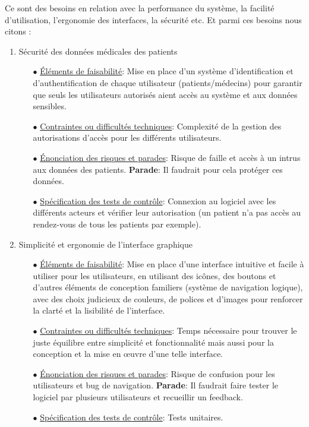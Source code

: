 \documentclass[a4paper]{report}
\begin{document}
Ce sont des besoins en relation avec la performance du système, la facilité d’utilisation,
l’ergonomie des interfaces, la sécurité etc. Et parmi ces besoins nous citons :
\begin{enumerate}
    \item Sécurité des données médicales des patients\newline
    \begin{itemize}
        \item[$\bullet$] \underline{Éléments de faisabilité}: Mise en place d’un système d’identification et d’authentification de chaque utilisateur (patients/médecins) pour garantir que seuls les utilisateurs autorisés aient accès au système et aux données sensibles.
        \item[$\bullet$] \underline{Contraintes ou difficultés techniques}: Complexité de la gestion des autorisations d'accès pour les différents utilisateurs.
        \item[$\bullet$] \underline{Énonciation des risques et parades}: Risque de faille et accès à un intrus aux données des patients.\newline
        \textbf{Parade}: Il faudrait pour cela protéger ces données.
        \item[$\bullet$] \underline{Spécification des tests de contrôle}: Connexion au logiciel avec les différents acteurs et vérifier leur autorisation (un patient n’a pas accès au rendez-vous de tous les patients par exemple). \newline
    \end{itemize}

\item Simplicité et ergonomie de l’interface graphique\newline
\begin{itemize}
    \item[$\bullet$] \underline{Éléments de faisabilité}: Mise en place d’une interface intuitive et facile à utiliser pour les utilisateurs, 
    en utilisant des icônes, des boutons et d'autres éléments de conception familiers (système de navigation logique), avec des choix judicieux de couleurs, 
    de polices et d’images pour renforcer la clarté et la lisibilité de l'interface.
    \item[$\bullet$] \underline{Contraintes ou difficultés techniques}: Temps nécessaire pour trouver le juste équilibre entre simplicité et fonctionnalité 
    mais aussi pour la conception et la mise en œuvre d’une telle interface.
    \item[$\bullet$] \underline{Énonciation des risques et parades}: Risque de confusion pour les utilisateurs et bug de navigation.\newline
    \textbf{Parade}: Il faudrait faire tester le logiciel par plusieurs utilisateurs et recueillir un feedback.
    \item[$\bullet$] \underline{Spécification des tests de contrôle}: Tests unitaires.	\newline
\end{itemize}


\end{enumerate}
\end{document}
